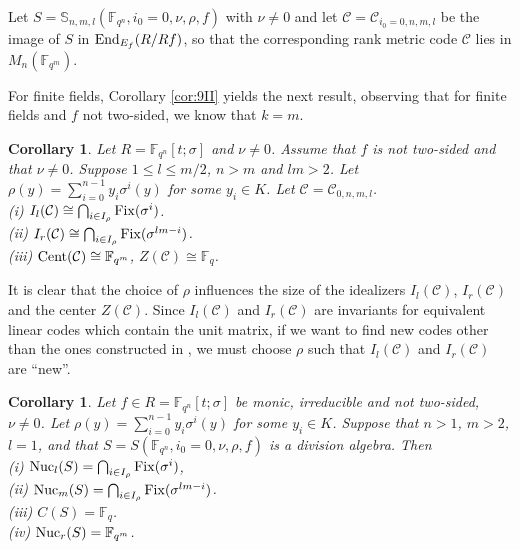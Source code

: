 \documentclass[12pt]{amsart}
\theoremstyle{plain}
\newtheorem{corollary}[theorem]{Corollary}
\theoremstyle{definition}
\numberwithin{equation}{section}
\numberwithin{figure}{section}
\begin{document}
Let $S=\mathbb{S}_{n,m,l}(\mathbb{F}_{q^n},i_0=0,\nu,\rho,f)$ with $\nu\neq 0$ and let $\mathcal{C}=\mathcal{C}_{i_0=0   , n,m,l}$ be the image of $S$ in  ${\rm End}_{E_f}(R/Rf)$, so that the corresponding rank metric code $\mathcal{C}$ lies in $M_n(\mathbb{F}_{q^m})$.


For finite fields, Corollary \ref{cor:9II} yields the next result, observing that for finite fields and $f$ not two-sided, we know that $k=m$.

\begin{corollary}\label{cor:theorem 9II}
Let $R=\mathbb{F}_{q^n}[t;\sigma]$ and $\nu\not=0$. Assume that $f$ is not two-sided
and that $\nu\not=0$. Suppose $1\leq l\leq m/2$, $n>m$ and $lm>2$.
 Let $\rho(y)= \sum_{i=0}^{n-1}y_i\sigma^i(y)$
 for some $y_i\in K$.  Let $\mathcal{C}=\mathcal{C}_{0,n,m,l}$.
\\ (i) $I_l(\mathcal{C})\cong \bigcap_{i\in I_\rho} {\rm Fix}(\sigma^i)$.
\\ (ii) $I_r(\mathcal{C})  \cong \bigcap_{i\in I_\rho} {\rm Fix}(\sigma^{lm-i})$.
\\ (iii) ${\rm Cent}(\mathcal{C})\cong \mathbb{F}_{q^m}$, $Z(\mathcal{C})\cong \mathbb{F}_q$.
\end{corollary}

 It is clear that the choice of $\rho$ influences the size of the idealizers $I_l(\mathcal{C}) $, $I_r(\mathcal{C}) $ and the center $Z(\mathcal{C})$.
Since $I_l(\mathcal{C}) $ and $I_r(\mathcal{C}) $
are invariants for equivalent linear codes which contain the unit matrix, if we want to find new codes other than the ones constructed in \cite{Sheekey}, we must choose $\rho$ such that $I_l(\mathcal{C})$ and $I_r(\mathcal{C})$
 are ``new''.


\begin{corollary}\label{cor:nuclei K}
Let $f\in R=\mathbb{F}_{q^n}[t;\sigma]$ be monic, irreducible and not two-sided, $\nu\neq 0$. %
 Let $\rho(y)= \sum_{i=0}^{n-1}y_i\sigma^i(y)$
 for some $y_i\in K$.
  Suppose that $n>1$, $m>2$, $l=1$, and that $S=S(\mathbb{F}_{q^n},i_0=0,\nu,\rho,f)$ is a division algebra. Then
\\ (i) ${\rm Nuc}_l(S)= \bigcap_{i\in I_\rho} {\rm Fix}(\sigma^i)$,
\\ (ii) ${\rm Nuc}_m(S)= \bigcap_{i\in I_\rho} {\rm Fix}(\sigma^{lm-i})$.
\\ (iii) $ C(S)= \mathbb{F}_{q}$.
\\ (iv) ${\rm Nuc}_r(S)=\mathbb{F}_{q^m}$.
\end{corollary}
\end{document}
